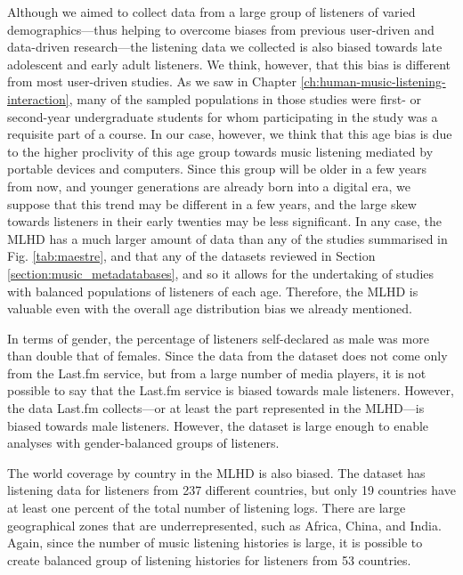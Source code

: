 Although we aimed to collect data from a large group of listeners of varied demographics---thus helping to overcome biases from previous user-driven and data-driven research---the listening data we collected is also biased towards late adolescent and early adult listeners. We think, however, that this bias is different from most user-driven studies. 
As we saw in Chapter \ref{ch:human-music-listening-interaction}, many of the sampled populations in those studies were first- or second-year undergraduate students for whom participating in the study was a requisite part of a course. 
In our case, however, we think that this age bias is due to the higher proclivity of this age group towards music listening mediated by portable devices and computers. Since this group will be older in a few years from now, and younger generations are already born into a digital era, we suppose that this trend may be different in a few years, and the large skew towards listeners in their early twenties may be less significant.
In any case, the MLHD has a much larger amount of data than any of the studies summarised in Fig. \ref{tab:maestre}, and that any of the datasets reviewed in Section \ref{section:music_metadatabases}, and so it allows for the undertaking of studies with balanced populations of listeners of each  age. Therefore, the MLHD is valuable even with the overall age distribution bias we already mentioned.

In terms of gender, the percentage of listeners self-declared as male was more than double that of females. Since the data from the dataset does not come only from the Last.fm service, but from  a large number of media players, it is not possible to say that the Last.fm service is biased towards male listeners. However, the data Last.fm collects---or at least the part represented in the MLHD---is biased towards male listeners. However, the dataset is large enough to enable analyses with gender-balanced groups of listeners.

The world coverage by country in the MLHD is also biased. The dataset has listening data for listeners from 237 different countries, but only 19 countries have at least one percent of the total number of listening logs. There are large geographical zones that are underrepresented, such as Africa, China, and India. 
Again, since the number of music listening histories is large, it is possible to create balanced group of listening histories for listeners from 53 countries. 


